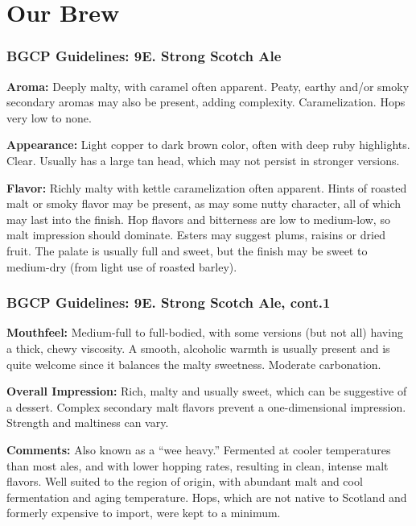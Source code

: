\documentclass{beamer}
\begin{document}
\section{Our Brew}
\begin{frame}
  \frametitle{BGCP Guidelines: 9E. Strong Scotch Ale}
  {\footnotesize

\textbf{Aroma:} Deeply malty, with caramel often apparent. Peaty, earthy and/or smoky secondary aromas may also be present, adding complexity. Caramelization. Hops very low to none.

\textbf{Appearance:} Light copper to dark brown color, often with deep ruby highlights. Clear. Usually has a large tan head, which may not persist in stronger versions.

\textbf{Flavor:} Richly malty with kettle caramelization often apparent. Hints of roasted malt or smoky flavor may be present, as may some nutty character, all of which may last into the finish. Hop flavors and bitterness are low to medium-low, so malt impression should dominate.  Esters may suggest plums, raisins or dried fruit. The palate is usually full and sweet, but the finish may be sweet to medium-dry (from light use of roasted barley).

}
\end{frame}
\begin{frame}
  \frametitle{BGCP Guidelines: 9E. Strong Scotch Ale, cont.1}
  {\footnotesize

\textbf{Mouthfeel:} Medium-full to full-bodied, with some versions (but not all) having a thick, chewy viscosity. A smooth, alcoholic warmth is usually present and is quite welcome since it balances the malty sweetness. Moderate carbonation.

\textbf{Overall Impression:} Rich, malty and usually sweet, which can be suggestive of a dessert. Complex secondary malt flavors prevent a one-dimensional impression. Strength and maltiness can vary.

\textbf{Comments:} Also known as a “wee heavy.” Fermented at cooler temperatures than most ales, and with lower hopping rates, resulting in clean, intense malt flavors. Well suited to the region of origin, with abundant malt and cool fermentation and aging temperature. Hops, which are not native to Scotland and formerly expensive to import, were kept to a minimum.
}
\end{frame}
\end{document}
